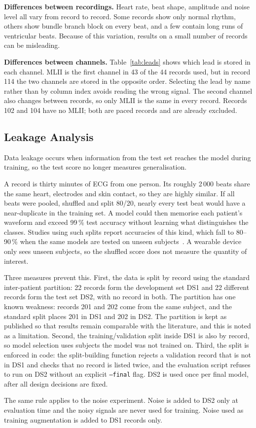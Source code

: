 

\textbf{Differences between recordings.} Heart rate, beat shape, amplitude and noise level all vary from record to record. Some records show only normal rhythm, others show bundle branch block on every beat, and a few contain long runs of ventricular beats. Because of this variation, results on a small number of records can be misleading.

\textbf{Differences between channels.} Table~\ref{tab:leads} shows which lead is stored in each channel. MLII is the first channel in 43 of the 44 records used, but in record 114 the two channels are stored in the opposite order. Selecting the lead by name rather than by column index avoids reading the wrong signal. The second channel also changes between records, so only MLII is the same in every record. Records 102 and 104 have no MLII; both are paced records and are already excluded.



\subsection{Leakage Analysis}

Data leakage occurs when information from the test set reaches the model during training, so the test score no longer measures generalisation.

A record is thirty minutes of ECG from one person. Its roughly 2\,000 beats share the same heart, electrodes and skin contact, so they are highly similar. If all beats were pooled, shuffled and split 80/20, nearly every test beat would have a near-duplicate in the training set. A model could then memorise each patient's waveform and exceed 99\,\% test accuracy without learning what distinguishes the classes. Studies using such splits report accuracies of this kind, which fall to 80--90\,\% when the same models are tested on unseen subjects~\cite{dechazal2004,luz2016survey}. A wearable device only sees unseen subjects, so the shuffled score does not measure the quantity of interest.

Three measures prevent this. First, the data is split by record using the standard inter-patient partition: 22 records form the development set DS1 and 22 different records form the test set DS2, with no record in both. The partition has one known weakness: records 201 and 202 come from the same subject, and the standard split places 201 in DS1 and 202 in DS2. The partition is kept as published so that results remain comparable with the literature, and this is noted as a limitation. Second, the training/validation split inside DS1 is also by record, so model selection uses subjects the model was not trained on. Third, the split is enforced in code: the split-building function rejects a validation record that is not in DS1 and checks that no record is listed twice, and the evaluation script refuses to run on DS2 without an explicit \texttt{--final} flag. DS2 is used once per final model, after all design decisions are fixed.

The same rule applies to the noise experiment. Noise is added to DS2 only at evaluation time and the noisy signals are never used for training. Noise used as training augmentation is added to DS1 records only.
